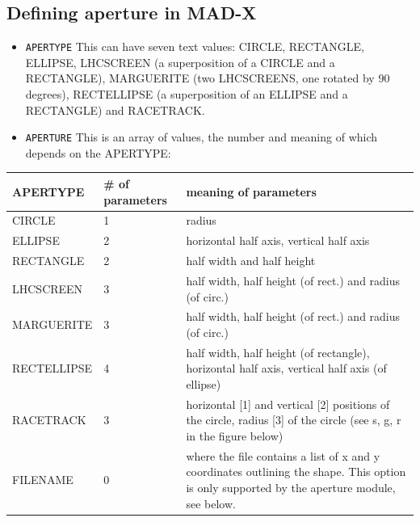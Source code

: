




\subsection{Defining aperture in MAD-X}
\begin{itemize}
	\item \texttt{APERTYPE} This can have seven text values: CIRCLE, RECTANGLE, ELLIPSE, LHCSCREEN (a superposition of a CIRCLE and a RECTANGLE), MARGUERITE (two LHCSCREENS, one rotated by 90 degrees),  RECTELLIPSE (a superposition of an ELLIPSE and a RECTANGLE) and RACETRACK. 
	\item \texttt{APERTURE} This is an array of values, the number and meaning  of which depends on the APERTYPE: 
\end{itemize}
\begin{tabular}{l | l | p{9cm}|}
\hline 
\textbf{APERTYPE} & \textbf{\# of parameters} & \textbf{meaning of parameters} \\ 
\hline
CIRCLE & 1 &  radius \\ 
\hline
ELLIPSE & 2 & horizontal half axis, vertical half axis \\ 
\hline
RECTANGLE & 2 & half width and half height \\ 
\hline
LHCSCREEN & 3 & half width, half height (of rect.) and radius (of circ.) \\ 
\hline
MARGUERITE & 3 & half width, half height (of rect.) and radius (of circ.) \\ 
\hline
RECTELLIPSE & 4 & half width, half height (of rectangle), horizontal half axis, vertical half axis (of ellipse) \\ 
\hline
RACETRACK & 3 & horizontal [1] and vertical [2] positions of the circle, radius [3] of the circle (see s, g, r in the figure below) \\ 
\hline
FILENAME & 0 & where the file contains a list of x and y coordinates outlining the shape. This option is only supported by the aperture module, see below. \\ 
\hline

\end{tabular}
